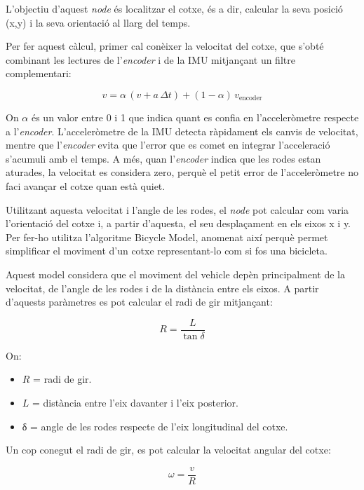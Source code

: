 \documentclass[11pt,a4paper]{article}
\begin{document}
L'objectiu d'aquest \emph{node} és localitzar el cotxe, és a dir, calcular la seva posició (x,y) i la seva orientació al llarg del temps.

Per fer aquest càlcul, primer cal conèixer la velocitat del cotxe, que s'obté combinant les lectures de l'\emph{encoder} i de la IMU mitjançant un filtre complementari:
\nopagebreak

\begin{equation*}
  v = \alpha\,(v + a\,\Delta t) + (1-\alpha)\,v_{\text{encoder}}
\end{equation*}

On $\alpha$ és un valor entre 0 i 1 que indica quant es confia en l’acceleròmetre respecte a l’\emph{encoder}. L’acceleròmetre de la IMU detecta ràpidament els canvis de velocitat, mentre que l’\emph{encoder} evita que l’error que es comet en integrar l’acceleració s’acumuli amb el temps. A més, quan l’\emph{encoder} indica que les rodes estan aturades, la velocitat es considera zero, perquè el petit error de l’acceleròmetre no faci avançar el cotxe quan està quiet.

Utilitzant aquesta velocitat i l'angle de les rodes, el \emph{node} pot calcular com varia l'orientació del cotxe i, a partir d'aquesta, el seu desplaçament en els eixos x i y. Per fer-ho utilitza l'algoritme Bicycle Model, anomenat així perquè permet simplificar el moviment d'un cotxe representant-lo com si fos una bicicleta.

Aquest model considera que el moviment del vehicle depèn principalment de la velocitat, de l'angle de les rodes i de la distància entre els eixos. A partir d'aquests paràmetres es pot calcular el radi de gir mitjançant:
\nopagebreak

\begin{equation*}
  R = \frac{L}{\tan\delta}
\end{equation*}

On:
\nopagebreak

\begin{itemize}
  \item $R$ = radi de gir.
  \item $L$ = distància entre l'eix davanter i l'eix posterior.
  \item δ = angle de les rodes respecte de l'eix longitudinal del cotxe.
\end{itemize}

Un cop conegut el radi de gir, es pot calcular la velocitat angular del cotxe:
\nopagebreak

\begin{equation*}
  \omega = \frac{v}{R}
\end{equation*}
\end{document}
